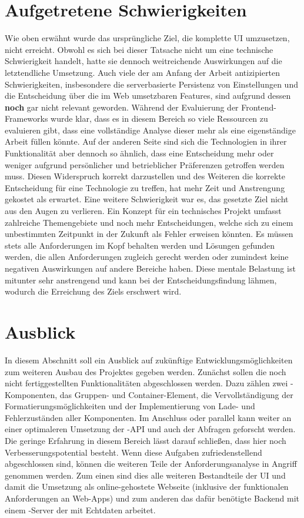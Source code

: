 \section{Aufgetretene Schwierigkeiten}
Wie oben erwähnt wurde das ursprüngliche Ziel, die komplette UI umzusetzen, nicht erreicht. Obwohl es sich bei dieser Tatsache nicht um eine technische Schwierigkeit handelt, hatte sie dennoch weitreichende Auswirkungen auf die letztendliche Umsetzung. Auch viele der am Anfang der Arbeit antizipierten Schwierigkeiten, insbesondere die serverbasierte Persistenz von Einstellungen und die Entscheidung über die im Web umsetzbaren Features, sind aufgrund dessen \textbf{noch} gar nicht relevant geworden.
Während der Evaluierung der Frontend-Frameworks wurde klar, dass es in diesem Bereich so viele Ressourcen zu evaluieren gibt, dass eine vollständige Analyse dieser mehr als eine eigenständige Arbeit füllen könnte. Auf der anderen Seite sind sich die Technologien in ihrer Funktionalität aber dennoch so ähnlich, dass eine Entscheidung mehr oder weniger aufgrund persönlicher und betrieblicher Präferenzen getroffen werden muss. Diesen Widerspruch korrekt darzustellen und des Weiteren die korrekte Entscheidung für eine Technologie zu treffen, hat mehr Zeit und Anstrengung gekostet als erwartet.
Eine weitere Schwierigkeit war es, das gesetzte Ziel nicht aus den Augen zu verlieren. Ein Konzept für ein technisches Projekt umfasst zahlreiche Themengebiete und noch mehr Entscheidungen, welche sich zu einem unbestimmten Zeitpunkt in der Zukunft als Fehler erweisen könnten. Es müssen stets alle Anforderungen im Kopf behalten werden und Lösungen gefunden werden, die allen Anforderungen zugleich gerecht werden oder zumindest keine negativen Auswirkungen auf andere Bereiche haben. Diese mentale Belastung ist mitunter sehr anstrengend und kann bei der Entscheidungsfindung lähmen, wodurch die Erreichung des Ziels erschwert wird.

\section{Ausblick}
In diesem Abschnitt soll ein Ausblick auf zukünftige Entwicklungsmöglichkeiten zum weiteren Ausbau des Projektes gegeben werden. Zunächst sollen die noch nicht fertiggestellten Funktionalitäten abgeschlossen werden. Dazu zählen zwei -Komponenten, das Gruppen- und Container-Element, die Vervollständigung der Formatierungsmöglichkeiten und der Implementierung von Lade- und Fehlerzuständen aller Komponenten.
Im Anschluss oder parallel kann weiter an einer optimaleren Umsetzung der -API und auch der Abfragen geforscht werden. Die geringe Erfahrung in diesem Bereich lässt darauf schließen, dass hier noch Verbesserungspotential besteht.
Wenn diese Aufgaben zufriedenstellend abgeschlossen sind, können die weiteren Teile der Anforderungsanalyse in Angriff genommen werden. Zum einen sind dies alle weiteren Bestandteile der UI und damit die Umsetzung als online-gehostete Webseite (inklusive der funktionalen Anforderungen an Web-Apps) und zum anderen das dafür benötigte Backend mit einem -Server der mit Echtdaten arbeitet.
